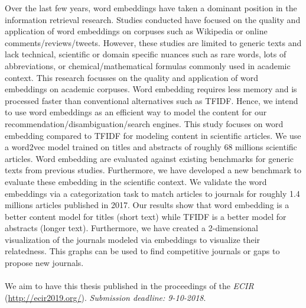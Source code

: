 \documentclass[../../Thesis.tex]{subfiles}
\begin{document}
Over the last few years, word embeddings have taken a dominant position in the information retrieval research. Studies conducted have focused on the quality and application of word embeddings on corpuses such as Wikipedia or online comments/reviews/tweets. However, these studies are limited to generic texts and lack technical, scientific or domain specific nuances such as rare words, lots of abbreviations, or chemical/mathematical formulas commonly used in academic context. This research focusses on the quality and application of word embeddings on academic corpuses. Word embedding requires less memory and is processed faster than conventional alternatives such as TFIDF. Hence, we intend to use word embeddings as an efficient way to model the content for our recommendation/disambiguation/search engines. This study focuses on word embedding compared to TFIDF for modeling content in scientific articles. We use a word2vec model  trained on titles and abstracts of roughly 68 millions scientific articles. Word embedding are evaluated against existing benchmarks for generic texts from previous studies. Furthermore, we have developed a new benchmark to evaluate these embedding in the scientific context. We validate the word embeddings via a categorization task to match articles to journals for roughly 1.4 millions articles published in 2017. Our results show that word embedding is a better content model for titles (short text) while TFIDF is a better model for abstracts (longer text). Furthermore, we have created a 2-dimensional visualization of the journals modeled via embeddings to visualize their relatedness. This graphs can be used to find competitive journals or gaps to propose new journals.\\
\vspace*{\fill}
\\
We aim to have this thesis published in the proceedings of the \textit{ECIR} (\url{http://ecir2019.org/}). \textit{Submission deadline: 9-10-2018}.
\end{document}
